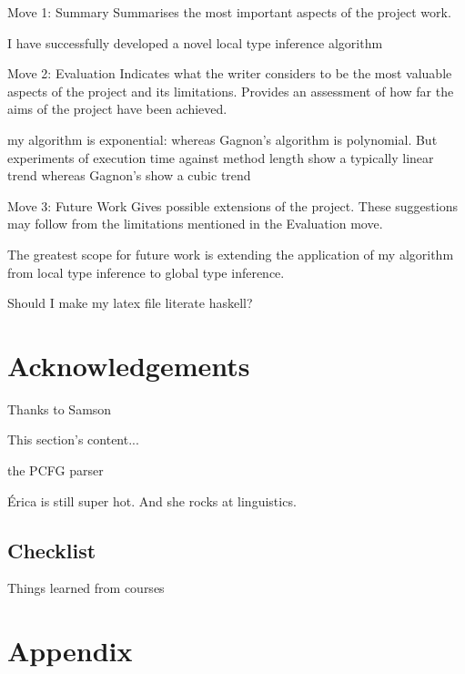 \documentclass[12pt]{article}
\let\stdsection\section
\renewcommand\section{\newpage\stdsection}
\begin{document}
Move 1: Summary 
Summarises the most important aspects of the project work.  

I have successfully developed a novel local type inference algorithm

Move 2: Evaluation
Indicates what the writer considers to be the most valuable aspects of the project and its limitations. Provides 
an assessment of how far the aims of the project have been achieved.

my algorithm is exponential: whereas Gagnon's algorithm is 
polynomial. But experiments of execution time against method length show a typically linear trend whereas 
Gagnon's show a cubic trend

Move 3: Future Work
Gives possible extensions of the project. These suggestions may follow from the limitations mentioned in the 
Evaluation move. 

The greatest scope for future work is extending the application of my algorithm from local type inference to 
global type inference.

Should I make my latex file literate haskell? %



\section{Acknowledgements}
Thanks to Samson

This section's content...\cite{visser1999donkey}

the PCFG parser\cite{klein2003accurate}

Érica is still super hot. And she rocks at linguistics.\cite{lander2001initial}

\subsection{Checklist}
Things learned from courses

\newpage
\section{Appendix}
\end{document}
